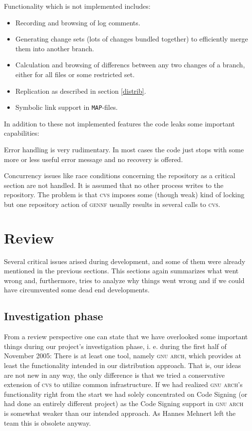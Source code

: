 \documentclass[fleqn, 10pt, a4paper]{report} \usepackage{amssymb}
\newcommand{\GENNF}{\textsc{gennf}}
\begin{document}
Functionality which is not implemented includes:

\begin{itemize}
\item Recording and browsing of log comments.
\item Generating change sets (lots of changes bundled together) to
  efficiently merge them into another branch.
\item Calculation and browsing of differencs between any two changes
  of a branch, either for all files or some restricted set.
\item Replication as described in section \ref{distrib}.
\item Symbolic link support in \texttt{MAP}-files.
\end{itemize}

In addition to these not implemented features the code leaks some
important capabilities:

Error handling is very rudimentary. In most cases the code just stops
with some more or less useful error message and no recovery is
offered.

Concurrency issues like race conditions concerning the repository as a
critical section are not handled. It is assumed that no other process
writes to the repository. The problem is that \textsc{cvs} imposes
some (though weak) kind of locking but one repository action of
\GENNF{} usually results in several calls to \textsc{cvs}.


\section{Review}

Several critical issues arised during development, and some of them
were already mentioned in the previous sections.
This sections again summarizes what went wrong and, furthermore, tries
to analyze why things went wrong and if we could have circumvented
some dead end developments.


\subsection{Investigation phase}

From a review perspective one can state that we have overlooked some
important things during our project's investigation phase, i. e.
during the first half of November 2005: There is at least one tool,
namely \textsc{gnu arch}, which provides at least the functionality
intended in our distribution approach. That is, our ideas are
not new in any way, the only difference is that we tried a conservative
extension of \textsc{cvs} to utilize common infrastructure.
If we had realized \textsc{gnu arch}'s functionality right from the
start we had solely concentrated on Code Signing (or had done an
entirely different project) as the Code Signing support in \textsc{gnu arch}
is somewhat weaker than our intended approach. As Hannes Mehnert
left the team this is obsolete anyway.
\end{document}
